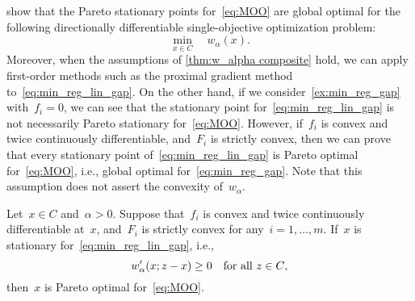 \documentclass[../../main]{subfiles}
\begin{document}
                         show that the Pareto stationary points for~\cref{eq:MOO} are global optimal for the following directionally differentiable single-objective optimization problem:
                        \begin{equation} \label{eq:min_reg_lin_gap}
                            \min_{x \in C} \quad w_\alpha(x)
                        .\end{equation} 
                        Moreover, when the assumptions of \cref{thm:w_alpha composite} hold, we can apply first-order methods such as the proximal gradient method~\cite{Fukushima1981} to~\cref{eq:min_reg_lin_gap}.
                        On the other hand, if we consider~\cref{ex:min_reg_gap} with~$f_i = 0$, we can see that the stationary point for~\cref{eq:min_reg_lin_gap} is not necessarily Pareto stationary for~\cref{eq:MOO}.
                        However, if~$f_i$ is convex and twice continuously differentiable, and~$F_i$ is strictly convex, then we can prove that every stationary point of~\cref{eq:min_reg_lin_gap} is Pareto optimal for~\cref{eq:MOO}, i.e., global optimal for~\cref{eq:min_reg_gap}.
                        Note that this assumption does not assert the convexity of~$w_\alpha$.
                        \begin{theorem}
                            Let~$x \in C$ and~$\alpha > 0$.
                            Suppose that~$f_i$ is convex and twice continuously differentiable at~$x$, and~$F_i$ is strictly convex for any~$i = 1, \dots, m$.
                            If~$x$ is stationary for~\cref{eq:min_reg_lin_gap}, i.e.,
                            \[
                                w_\alpha'(x; z - x) \ge 0 \quad \text{for all~$z \in C$}
                            ,\] 
                            then~$x$ is Pareto optimal for~\cref{eq:MOO}.
                        \end{theorem}
\end{document}
